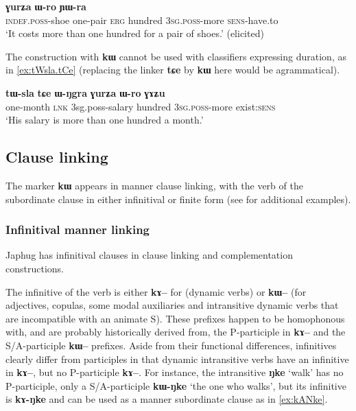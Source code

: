 \documentclass[oldfontcommands,oneside,a4paper,11pt]{article}
\newcommand{\ipa}[1]{{\phon\textbf{#1}}}
\begin{document}
  \begin{exe} 
\ex \label{ex:tWtCha.kW}
\gll  
[\ipa{tɯ-xtsa} 	\ipa{\textbf{tɯ-tɕʰa}}] 	\ipa{kɯ} 	\ipa{ɣurʑa} 	\ipa{ɯ-ro} 	\ipa{ɲɯ-ra} \\
\textsc{indef.poss}-shoe one-pair \textsc{erg} hundred \textsc{3sg.poss}-more \textsc{sens}-have.to \\
 \glt  `It costs more than one hundred for a pair of shoes.' (elicited)
\end{exe}  
The construction with \ipa{kɯ} cannot be used with classifiers expressing duration, as in \ref{ex:tWsla.tCe} (replacing the linker \ipa{tɕe} by \ipa{kɯ} here would be agrammatical).
 
 \begin{exe} 
\ex \label{ex:tWsla.tCe}
\gll  
  \ipa{tɯ-sla} \ipa{tɕe} \ipa{ɯ-ŋgra} \ipa{ɣurʑa} \ipa{ɯ-ro} \ipa{ɣɤʑu} \\
  one-month \textsc{lnk} 3sg.poss-salary hundred \textsc{3sg.poss}-more exist:\textsc{sens} \\
  \glt `His salary is more than one hundred a month.'
  \end{exe}  
 
  
 \subsection{Clause linking} \label{sec:linking}
 The marker \ipa{kɯ} appears in manner clause linking, with the verb of the subordinate clause in either infinitival or finite form (see \citealt{jacques14linking} for additional examples).
 
 \subsubsection{Infinitival manner linking} \label{sec:manner}
Japhug has infinitival clauses in clause linking and complementation constructions.

The infinitive of the verb is either \ipa{kɤ--} for (dynamic verbs) or \ipa{kɯ--} (for adjectives, copulas, some modal auxiliaries and intransitive dynamic verbs that are incompatible with an animate S). These prefixes happen to be homophonous with, and are probably historically derived from, the P-participle in \ipa{kɤ--} and the S/A-participle \ipa{kɯ--} prefixes. Aside from their functional differences, infinitives clearly differ from participles in that dynamic intransitive verbs have an infinitive in \ipa{kɤ--}, but no P-participle \ipa{kɤ--}. For instance, the intransitive \ipa{ŋke} `walk' has no P-participle, only a S/A-participle \ipa{kɯ-ŋke} `the one who walks', but its infinitive is \ipa{kɤ-ŋke} and can be used as a manner subordinate clause as in \ref{ex:kANke}.
\end{document}
